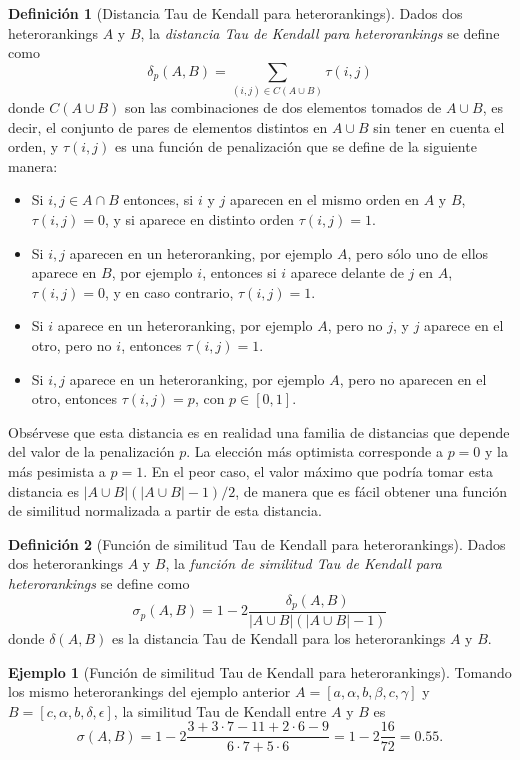 \documentclass[a4paper,10pt,twoside]{article}
\theoremstyle{definition}
\newtheorem{definition}{Definición}
\newtheorem{example}{Ejemplo}
\begin{document}
\begin{definition}[Distancia Tau de Kendall para heterorankings]
Dados dos heterorankings $A$ y $B$, la \emph{distancia Tau de Kendall para heterorankings} se define como
\[
\delta_p(A,B) = \sum_{(i,j)\in C(A\cup B)} \tau(i,j)
\]
donde $C(A\cup B)$ son las combinaciones de dos elementos tomados de $A\cup B$, es decir, el conjunto de pares de elementos distintos en $A\cup B$ sin tener en cuenta el orden, y $\tau(i,j)$ es una función de penalización que se define de la siguiente manera:
\begin{itemize}[noitemsep,label=--]
\item Si $i,j\in A\cap B$ entonces, si $i$ y $j$ aparecen en el mismo orden en $A$ y $B$, $\tau(i,j)=0$, y si aparece en distinto orden $\tau(i,j)=1$.
\item Si $i,j$ aparecen en un heteroranking, por ejemplo $A$, pero sólo uno de ellos aparece en $B$, por ejemplo $i$, entonces si $i$ aparece delante de $j$ en $A$, $\tau(i,j)=0$, y en caso contrario, $\tau(i,j)=1$.
\item Si $i$ aparece en un heteroranking, por ejemplo $A$, pero no $j$, y $j$ aparece en el otro, pero no $i$, entonces $\tau(i,j)=1$.
\item Si $i,j$ aparece en un heteroranking, por ejemplo $A$, pero no aparecen en el otro, entonces $\tau(i,j)=p$, con $p\in[0,1]$.
\end{itemize}
\end{definition}

Obsérvese que esta distancia es en realidad una familia de distancias que depende del valor de la penalización $p$. 
La elección más optimista corresponde a $p=0$ y la más pesimista a $p=1$.
En el peor caso, el valor máximo que podría tomar esta distancia es $|A\cup B|(|A\cup B|-1)/2$, de manera que es fácil obtener una función de similitud normalizada a partir de esta distancia.

\begin{definition}[Función de similitud Tau de Kendall para heterorankings]
Dados dos heterorankings $A$ y $B$, la \emph{función de similitud Tau de Kendall para
heterorankings} se define como 
\[
\sigma_p(A,B) = 1-2\frac{\delta_p(A,B)}{|A\cup B|(|A\cup B|-1)}
\]
donde $\delta(A,B)$ es la distancia Tau de Kendall para los heterorankings $A$ y $B$.
\end{definition}

\begin{example}[Función de similitud Tau de Kendall para heterorankings]
Tomando los mismo heterorankings del ejemplo anterior $A=[a,\alpha,b,\beta,c,\gamma]$ y $B=[c,\alpha,b,\delta,\epsilon]$, la similitud Tau de Kendall entre $A$ y $B$ es
\[
\sigma(A,B) = 1-2\frac{3+3\cdot 7-11+2\cdot 6-9}{6\cdot 7+5\cdot 6}= 1-2\frac{16}{72}= 0.55.
\]
\end{example}
\end{document}
